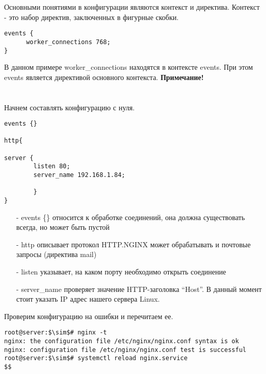 \documentclass[14pt, a4paper]{article}
\begin{document}
Основными понятиями в конфигурации являются контекст и директива. Контекст - это набор директив,
заключенных в фигурные скобки.

\vspace{0.3cm}
\begin{lstlisting}
events {
      worker_connections 768;
}
\end{lstlisting}
\vspace{0.2cm}

В данном примере \colorbox{backcolour}{worker\_connections} находятся в контексте \colorbox{backcolour}{events}. 
При этом \colorbox{backcolour}{events} является
директивой основного контекста. \textbf{Примечание!} 
 \\
 \\
\\

Начнем составлять конфигурацию с нуля.

\vspace{0.3cm}
\begin{lstlisting}
events {}

http{

server {
        listen 80;
        server_name 192.168.1.84;
    
        }
}
\end{lstlisting}
\vspace{0.2cm}

\begin{itemize}
    \item[-] \colorbox{backcolour}{events \{\}} относится к обработке соединений, она должна существовать всегда, но может
    быть пустой
    \item[-] \colorbox{backcolour}{http} описывает протокол HTTP.NGINX может обрабатывать и почтовые запросы (директива
    mail)
    \item[-] \colorbox{backcolour}{listen} указывает, на каком порту необходимо открыть соединение
    \item[-] \colorbox{backcolour}{server\_name} проверяет значение HTTP-заголовка “Host”. В данный момент стоит указать IP
    адрес нашего сервера Linux.
\end{itemize}

Проверим конфигурацию на ошибки и перечитаем ее.

\vspace{0.3cm}
\begin{lstlisting}
root@server:$\sim$# nginx -t
nginx: the configuration file /etc/nginx/nginx.conf syntax is ok
nginx: configuration file /etc/nginx/nginx.conf test is successful
root@server:$\sim$# systemctl reload nginx.service
$$
\end{lstlisting}
\vspace{0.2cm}
\end{document}
